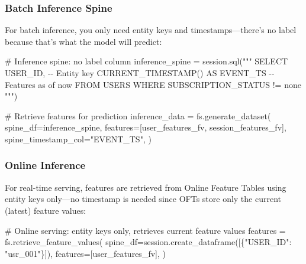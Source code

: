 \documentclass[
  letterpaper,
  DIV=11,
  numbers=noendperiod]{scrreprt}
\newenvironment{Shaded}{\begin{snugshade}}{\end{snugshade}}
\newcommand{\CommentTok}[1]{\textcolor[rgb]{0.37,0.37,0.37}{#1}}
\newcommand{\NormalTok}[1]{\textcolor[rgb]{0.00,0.23,0.31}{#1}}
\newcommand{\OperatorTok}[1]{\textcolor[rgb]{0.37,0.37,0.37}{#1}}
\newcommand{\StringTok}[1]{\textcolor[rgb]{0.13,0.47,0.30}{#1}}
\begin{document}
\hypertarget{batch-inference-spine}{%
\subsubsection{Batch Inference Spine}\label{batch-inference-spine}}

For batch inference, you only need entity keys and timestamps---there's
no label because that's what the model will predict:

\begin{Shaded}
\begin{Highlighting}[]
\CommentTok{\# Inference spine: no label column}
\NormalTok{inference\_spine }\OperatorTok{=}\NormalTok{ session.sql(}\StringTok{"""}
\StringTok{    SELECT }
\StringTok{        USER\_ID,                           {-}{-} Entity key}
\StringTok{        CURRENT\_TIMESTAMP() AS EVENT\_TS    {-}{-} Features as of now}
\StringTok{    FROM USERS}
\StringTok{    WHERE SUBSCRIPTION\_STATUS != \textquotesingle{}none\textquotesingle{}}
\StringTok{"""}\NormalTok{)}

\CommentTok{\# Retrieve features for prediction}
\NormalTok{inference\_data }\OperatorTok{=}\NormalTok{ fs.generate\_dataset(}
\NormalTok{    spine\_df}\OperatorTok{=}\NormalTok{inference\_spine,}
\NormalTok{    features}\OperatorTok{=}\NormalTok{[user\_features\_fv, session\_features\_fv],}
\NormalTok{    spine\_timestamp\_col}\OperatorTok{=}\StringTok{"EVENT\_TS"}\NormalTok{,}
\NormalTok{)}
\end{Highlighting}
\end{Shaded}

\hypertarget{online-inference}{%
\subsubsection{Online Inference}\label{online-inference}}

For real-time serving, features are retrieved from Online Feature Tables
using entity keys only---no timestamp is needed since OFTs store only
the current (latest) feature values:

\begin{Shaded}
\begin{Highlighting}[]
\CommentTok{\# Online serving: entity keys only, retrieves current feature values}
\NormalTok{features }\OperatorTok{=}\NormalTok{ fs.retrieve\_feature\_values(}
\NormalTok{    spine\_df}\OperatorTok{=}\NormalTok{session.create\_dataframe([\{}\StringTok{"USER\_ID"}\NormalTok{: }\StringTok{"usr\_001"}\NormalTok{\}]),}
\NormalTok{    features}\OperatorTok{=}\NormalTok{[user\_features\_fv],}
\NormalTok{)}
\end{Highlighting}
\end{Shaded}
\end{document}
